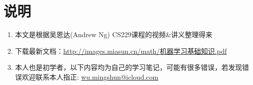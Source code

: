 \section{说明}
\begin{enumerate}
	\item 本文是根据吴恩达(Andrew Ng) CS229课程的视频\&讲义整理得来
	\item 下载最新文档：\href{http://images.miasun.cn/math/机器学习基础知识.pdf}{http://images.miasun.cn/math/机器学习基础知识.pdf}
	\item 本人也是初学者，以下内容均为自己的学习笔记，可能有很多错误，若发现错误欢迎联系本人指正: \href{mailto:wu.mingshun@icloud.com}{wu.mingshun@icloud.com}
	
\end{enumerate}



























